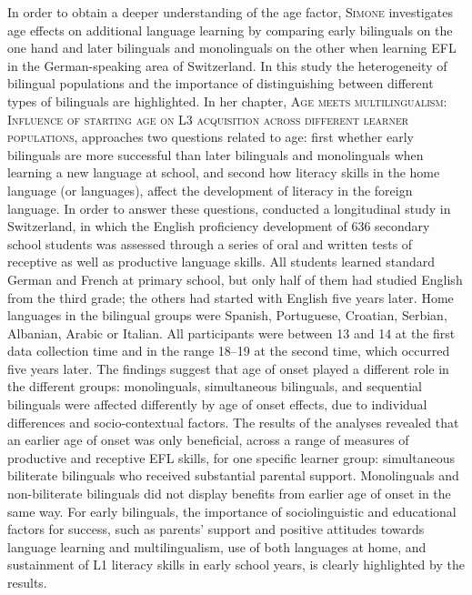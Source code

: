 \documentclass[output=paper,colorlinks,citecolor=brown,nonflat]{langsci/langscibook}
\begin{document}
In order to obtain a deeper understanding of the age factor, \textsc{Simone \citeauthor{chapters/pfenninger}} investigates age effects on additional language learning by comparing early bilinguals on the one hand and later bilinguals and monolinguals on the other when learning EFL in the German-speaking area of Switzerland. In this study the heterogeneity of bilingual populations and the importance of distinguishing between different types of bilinguals are highlighted. In her chapter, \textsc{Age meets multilingualism: Influence of starting age on L3 acquisition across different learner populations}, \citeauthor{chapters/pfenninger} approaches two questions related to age: first whether early bilinguals are more successful than later bilinguals and monolinguals when learning a new language at school, and second how literacy skills in the home language (or languages), affect the development of literacy in the foreign language. In order to answer these questions, \citeauthor{chapters/pfenninger} conducted a longitudinal study in Switzerland, in which the English proficiency development of 636 secondary school students was assessed through a series of oral and written tests of receptive as well as productive language skills. All students learned standard German and French at primary school, but only half of them had studied English from the third grade; the others had started with English five years later. Home languages in the bilingual groups were Spanish, Portuguese, Croatian, Serbian, Albanian, Arabic or Italian. All participants were between 13 and 14 at the first data collection time and in the range 18--19 at the second time, which occurred five years later. The findings suggest that age of onset played a different role in the different groups: monolinguals, simultaneous bilinguals, and sequential bilinguals were affected differently by age of onset effects, due to individual differences and socio-contextual factors. The results of the analyses revealed that an earlier age of onset was only beneficial, across a range of measures of productive and receptive EFL skills, for one specific learner group: simultaneous biliterate bilinguals who received substantial parental support. Monolinguals and non-biliterate bilinguals did not display benefits from earlier age of onset in the same way. For early bilinguals, the importance of sociolinguistic and educational factors for success, such as parents’ support and positive attitudes towards language learning and multilingualism, use of both languages at home, and sustainment of L1 literacy skills in early school years, is clearly highlighted by the results.
\end{document}
